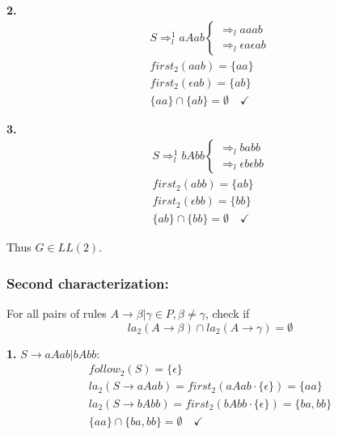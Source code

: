 \textbf{2.}
\begin{equation*}
\begin{split}
S \Rightarrow_l^{1} aAab \begin{cases}\Rightarrow_l aaab\\ \Rightarrow_l \epsilon a\epsilon ab\end{cases} \\
first_2(aab) = \{aa\} \\
first_2(\epsilon ab) = \{ab\} \\
\{aa\} \cap \{ab\} = \emptyset \quad \checkmark
\end{split}
\end{equation*}

\textbf{3.}
\begin{equation*}
\begin{split}
S \Rightarrow_l^{1} bAbb \begin{cases}\Rightarrow_l babb\\ \Rightarrow_l \epsilon b\epsilon bb\end{cases} \\
first_2(abb) = \{ab\} \\
first_2(\epsilon bb) = \{bb\} \\
\{ab\} \cap \{bb\} = \emptyset \quad \checkmark
\end{split}
\end{equation*}

Thus $G \in LL(2)$.

\subsubsection*{Second characterization:}

For all pairs of rules $A \rightarrow \beta | \gamma \in P, \beta \neq \gamma$, check if
\begin{equation*}
la_2(A\rightarrow \beta) \cap la_2(A\rightarrow \gamma) = \emptyset
\end{equation*}

\textbf{1.} $S \rightarrow aAab | bAbb$:
\begin{equation*}
\begin{split}
follow_2(S) = \{\epsilon\} \\
la_2(S\rightarrow aAab) = first_2(aAab \cdot \{\epsilon\}) = \{aa\} \\
la_2(S\rightarrow bAbb) = first_2(bAbb \cdot \{\epsilon\}) = \{ba, bb\} \\
\{aa\} \cap \{ba, bb\} = \emptyset \quad \checkmark
\end{split}
\end{equation*}

